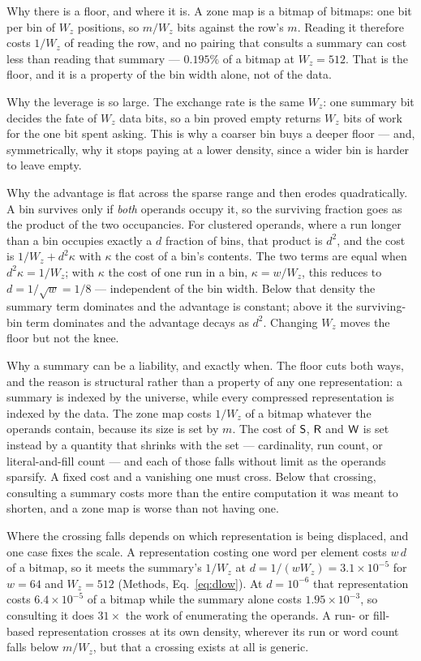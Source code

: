 Why there is a floor, and where it is. A zone map is a bitmap of bitmaps: one bit per bin of
$W_z$ positions, so $m/W_z$ bits against the row's $m$. Reading it therefore costs $1/W_z$ of reading
the row, and no pairing that consults a summary can cost less than reading that summary --- $0.195\%$
of a bitmap at $W_z = 512$. That is the floor, and it is a property of the bin width alone, not of the
data.

Why the leverage is so large. The exchange rate is the same $W_z$: one summary bit decides the
fate of $W_z$ data bits, so a bin proved empty returns $W_z$ bits of work for the one bit spent
asking. This is why a coarser bin buys a deeper floor --- and, symmetrically, why it stops paying at a
lower density, since a wider bin is harder to leave empty.

Why the advantage is flat across the sparse range and then erodes quadratically. A bin
survives only if \emph{both} operands occupy it, so the surviving fraction goes as the product of the
two occupancies. For clustered operands, where a run longer than a bin occupies exactly a $d$ fraction
of bins, that product is $d^2$, and the cost is $1/W_z + d^2\kappa$ with $\kappa$ the cost of a bin's
contents. The two terms are equal when $d^2\kappa = 1/W_z$; with $\kappa$ the cost of one run in a
bin, $\kappa = w/W_z$, this reduces to $d = 1/\sqrt{w} = 1/8$ --- independent of the bin
width. Below that density the summary term dominates and the advantage is constant; above it the
surviving-bin term dominates and the advantage decays as $d^{2}$. Changing $W_z$ moves the floor but
not the knee.

Why a summary can be a liability, and exactly when. The floor cuts both ways, and the reason is
structural rather than a property of any one representation: a summary is indexed by the
universe, while every compressed representation is indexed by the data. The zone map costs $1/W_z$
of a bitmap whatever the operands contain, because its size is set by $m$. The cost of $\textsf{S}$, $\textsf{R}$
and $\textsf{W}$ is set instead by a quantity that shrinks with the set --- cardinality, run count, or
literal-and-fill count --- and each of those falls without limit as the operands sparsify. A fixed
cost and a vanishing one must cross. Below that crossing, consulting a summary costs more than
the entire computation it was meant to shorten, and a zone map is worse than not having one.

Where the crossing falls depends on which representation is being displaced, and one case fixes the
scale. A representation costing one word per element costs $w\,d$ of a bitmap, so it meets the
summary's $1/W_z$ at $d = 1/(wW_z) = 3.1\times10^{-5}$ for $w = 64$ and $W_z = 512$ (Methods,
Eq.~\eqref{eq:dlow}). At $d = 10^{-6}$ that representation costs $6.4\times10^{-5}$ of a bitmap while
the summary alone costs $1.95\times10^{-3}$, so consulting it does $31\times$ the work of
enumerating the operands. A run- or fill-based representation crosses at its own density, wherever its
run or word count falls below $m/W_z$, but that a crossing exists at all is generic.

